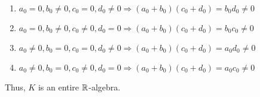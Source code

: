 \begin{ProbBox}
\begin{solution}
\begin{enumerate}
  \item $a_0=0, b_0 \neq 0, c_0=0, d_0 \neq 0 \Rightarrow (a_0+b_0)(c_0+d_0) = b_0 d_0 \neq 0$
  \item $a_0=0, b_0 \neq 0, c_0 \neq 0, d_0=0 \Rightarrow (a_0+b_0)(c_0+d_0) = b_0 c_0 \neq 0$
  \item $a_0 \neq 0, b_0=0, c_0=0, d_0 \neq 0 \Rightarrow (a_0+b_0)(c_0+d_0) = a_0 d_0 \neq 0$
  \item $a_0 \neq 0, b_0=0, c_0 \neq 0, d_0=0 \Rightarrow (a_0+b_0)(c_0+d_0) = a_0 c_0 \neq 0$
\end{enumerate}
Thus, $K$ is an entire $\mathbb{R}$-algebra.
\end{solution}
\end{ProbBox}
\probskip


